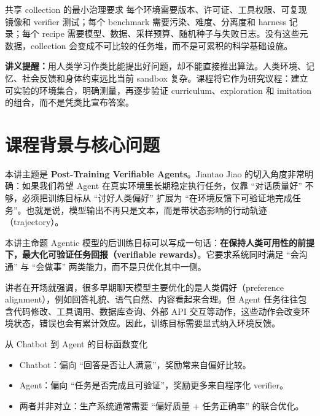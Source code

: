 \documentclass[a4paper]{article}
\begin{document}
\begin{importantbox}{共享 collection 的最小治理要求}
每个环境需要版本、许可证、工具权限、可复现镜像和 verifier 测试；每个 benchmark 需要污染、难度、分离度和 harness 记录；每个 recipe 需要模型、数据、采样预算、随机种子与失败日志。没有这些元数据，collection 会变成不可比较的任务堆，而不是可累积的科学基础设施。
\end{importantbox}

\textbf{讲义提醒：}用人类学习作类比能提出好问题，却不能直接推出算法。人类环境、记忆、社会反馈和身体约束远比当前 sandbox 复杂。课程将它作为研究议程：建立可实验的环境集合，明确测量，再逐步验证 curriculum、exploration 和 imitation 的组合，而不是凭类比宣布答案。

\section{课程背景与核心问题}

本讲主题是 \textbf{Post-Training Verifiable Agents}。Jiantao Jiao 的切入角度非常明确：如果我们希望 Agent 在真实环境里长期稳定执行任务，仅靠 ``对话质量好'' 不够，必须把训练目标从 ``讨好人类偏好'' 扩展为 ``在环境反馈下可验证地完成任务''。也就是说，模型输出不再只是文本，而是带状态影响的行动轨迹（trajectory）。

\begin{importantbox}{本讲主命题}
Agentic 模型的后训练目标可以写成一句话：\textbf{在保持人类可用性的前提下，最大化可验证任务回报（verifiable rewards）}。它要求系统同时满足 ``会沟通'' 与 ``会做事'' 两类能力，而不是只优化其中一侧。
\end{importantbox}

讲者在开场就强调，很多早期聊天模型主要优化的是人类偏好（preference alignment），例如回答礼貌、语气自然、内容看起来合理。但 Agent 任务往往包含代码修改、工具调用、数据库查询、外部 API 交互等动作，这些动作会改变环境状态，错误也会有累计效应。因此，训练目标需要显式纳入环境反馈。

\begin{knowledgebox}{从 Chatbot 到 Agent 的目标函数变化}
\begin{itemize}
    \item Chatbot：偏向 ``回答是否让人满意''，奖励常来自偏好比较。
    \item Agent：偏向 ``任务是否完成且可验证''，奖励更多来自程序化 verifier。
    \item 两者并非对立：生产系统通常需要 ``偏好质量 + 任务正确率'' 的联合优化。
\end{itemize}
\end{knowledgebox}
\end{document}
